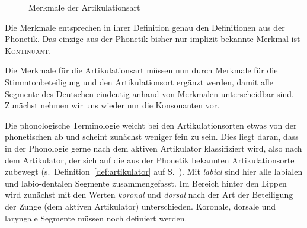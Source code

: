 \begin{figure}[!h]
  \centering
  \caption{Merkmale der Artikulationsart}
  \label{fig:artart}
\end{figure}

Die Merkmale entsprechen in ihrer Definition genau den Definitionen aus der Phonetik.
Das einzige aus der Phonetik bisher nur implizit bekannte Merkmal ist \textsc{Kontinuant}.

\newpage


Die Merkmale für die Artikulationsart müssen nun durch Merkmale für die Stimmtonbeteiligung und den Artikulationsort ergänzt werden, damit alle Segmente des Deutschen eindeutig anhand von Merkmalen unterscheidbar sind.
Zunächst nehmen wir uns wieder nur die Konsonanten vor.

\begin{exe}
  \ex
  \begin{xlist}
  \end{xlist}
\end{exe}

Die phonologische Terminologie weicht bei den Artikulationsorten etwas von der phonetischen ab und scheint zunächst weniger fein zu sein.
Dies liegt daran, dass in der Phonologie gerne nach dem aktiven Artikulator klassifiziert wird, also nach dem Artikulator, der sich auf die aus der Phonetik bekannten Artikulationsorte zubewegt (s.\ Definition~\ref{def:artikulator} auf S.~\pageref{def:artikulator}).
Mit \textit{labial} sind hier alle labialen und labio-dentalen Segmente zusammengefasst.
Im Bereich hinter den Lippen wird zunächst mit den Werten \textit{koronal} und \textit{dorsal} nach der Art der Beteiligung der Zunge (dem aktiven Artikulator) unterschieden.
Koronale, dorsale und laryngale Segmente müssen noch definiert werden.

